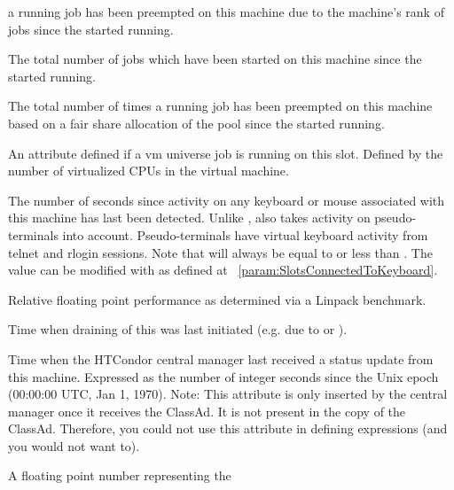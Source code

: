 \begin{description}
a running job has been preempted on this machine due to the machine's
rank of jobs since the  started running.  
%
\item[\AdAttr{JobStarts}:] The total number of jobs which
have been started on this machine since the  started running.
%
\item[\AdAttr{JobUserPrioPreemptions}:] The total number of times
a running job has been preempted on this machine based on a fair share
allocation of the pool 
since the  started running.  
%
\item[\AdAttr{JobVM\_VCPUS}:] An attribute defined if a vm universe job
is running on this slot.  Defined by the number of virtualized CPUs
in the virtual machine.
%
\item[\AdAttr{KeyboardIdle}:] The number of seconds since activity on any
keyboard or mouse associated with this machine has last been detected.
Unlike ,  also takes activity 
on pseudo-terminals into
account.
Pseudo-terminals have virtual keyboard activity from telnet and rlogin
sessions.  Note that  will always be equal to or
less than .
The value can be modified with 
as defined at ~\ref{param:SlotsConnectedToKeyboard}.
%
\item[\AdAttr{KFlops}:] Relative floating point performance as determined via a
Linpack benchmark.
%
\item[\AdAttr{LastDrainStartTime}:] Time when draining of this
 was last initiated (e.g. due to  or
).
%
\item[\AdAttr{LastHeardFrom}:] Time when the HTCondor central manager last
received a status update from this machine.  
Expressed as 
the number of integer seconds since the Unix epoch (00:00:00 UTC, Jan 1, 1970).
Note: This attribute is only inserted by the central manager once it
receives the ClassAd.
It is not present in the  copy of the ClassAd.
Therefore, you could not use this attribute in defining 
expressions (and you would not want to).
%
\item[\AdAttr{LoadAvg}:] A floating point number representing the 

\end{description}

